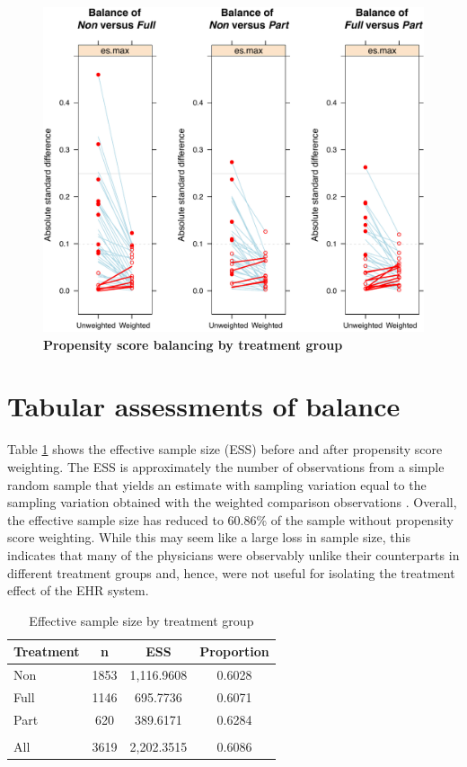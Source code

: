 \documentclass[12pt]{report}
\begin{document}
\begin{figure}[!htb]
\begin{center}
\includegraphics[width=\textwidth]{psdiag4.pdf}
\caption{{\bf Propensity score balancing by treatment group}}
\label{fig:diag4}
\end{center}
\end{figure}

\section{Tabular assessments of balance}
Table \ref{tab:ess} shows the effective sample size (ESS) before and after propensity score weighting. The ESS is approximately the number of observations from a simple random sample that yields an estimate with sampling variation equal to the sampling variation obtained with the weighted comparison observations \citep{twangvignettes}.  Overall, the effective sample size has reduced to 60.86\% of the sample without propensity score weighting. While this may seem like a large loss in sample size, this indicates that many of the physicians were observably unlike their counterparts in different treatment groups and, hence, were not useful for isolating the treatment effect of the EHR system.

\begin{table}[h]
\caption{Effective sample size by treatment group}
\centering
\footnotesize
\label{tab:ess}
\begin{tabular}{lccc}
\hline \hline
Treatment & n    & ESS        & Proportion \\ \hline
Non       & 1853 & 1,116.9608 & 0.6028     \\
Full      & 1146 & 695.7736   & 0.6071     \\
Part      & 620  & 389.6171   & 0.6284     \\
          &     &               &           \\
All       & 3619 & 2,202.3515 & 0.6086     \\ \hline \hline 
\end{tabular}
\end{table}
\end{document}
